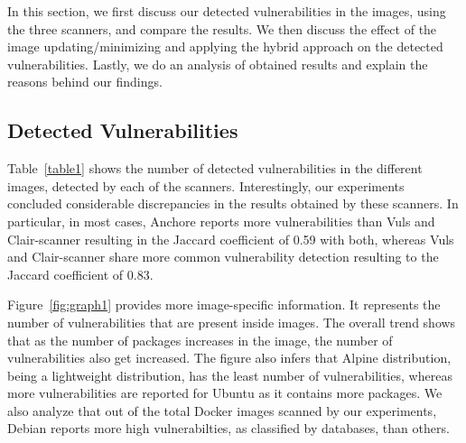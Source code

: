 \documentclass[a4paper,num-refs]{oup-contemporary}
\begin{document}
In this section,
we first discuss our detected vulnerabilities in the images, using the three scanners, and compare the
results. We then discuss the effect of the image updating/minimizing and applying the hybrid
approach on the detected vulnerabilities.
Lastly, we do an analysis of obtained results and explain the reasons behind our
findings.

\subsection{Detected Vulnerabilities}

Table~\ref{table1} shows the number of detected vulnerabilities in the different images,
detected by each of the scanners.
Interestingly, our experiments concluded considerable discrepancies in the results obtained by
these scanners. In particular, in most cases,
Anchore reports more vulnerabilities than Vuls and Clair-scanner resulting in 
the Jaccard coefficient of 0.59 with both,
whereas Vuls and Clair-scanner share more common vulnerability detection resulting to the Jaccard coefficient of 0.83.

Figure~\ref{fig:graph1} provides more image-specific information.
It represents the number of vulnerabilities that are present inside images.
The overall trend shows that as the number of packages increases in the image, the number of vulnerabilities
also get increased.
The figure also infers that Alpine distribution, being a
lightweight distribution, has the least number of vulnerabilities, whereas more vulnerabilities are reported for
Ubuntu as it contains more packages.
We also analyze that out of the total Docker images scanned by our experiments, Debian reports more high vulnerabilties, as
classified by databases, than others.
\end{document}
